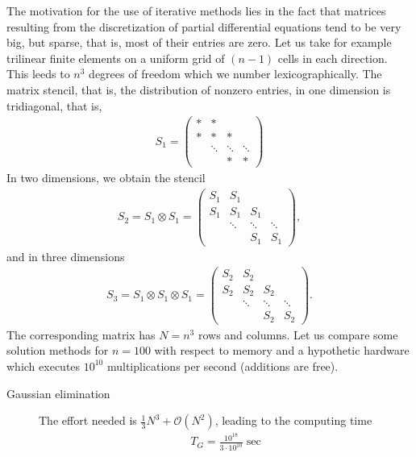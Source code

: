 
\begin{intro}
  The motivation for the use of iterative methods lies in the fact
  that matrices resulting from the discretization of partial
  differential equations tend to be very big, but sparse, that is,
  most of their entries are zero. Let us take for example trilinear
  finite elements on a uniform grid of $(n-1)$ cells in each
  direction. This leeds to $n^3$ degrees of freedom which we number
  lexicographically. The matrix stencil, that is, the distribution of
  nonzero entries, in one dimension is tridiagonal, that is,
  \begin{gather*}
    S_1 =
    \begin{pmatrix}
      * & * \\ * & * & * \\
      & \ddots & \ddots & \ddots \\
      && * & *
    \end{pmatrix}
  \end{gather*}
  In two dimensions, we obtain the stencil
  \begin{gather*}
    S_2 = S_1 \otimes S_1
    =
    \begin{pmatrix}
      S_1 & S_1 \\
      S_1 & S_1 & S_1 \\
      & \ddots & \ddots & \ddots \\
      &&S_1 & S_1
    \end{pmatrix},
  \end{gather*}
  and in three dimensions
  \begin{gather*}
    S_3 = S_1 \otimes S_1 \otimes S_1
    =
    \begin{pmatrix}
      S_2 & S_2 \\
      S_2 & S_2 & S_2 \\
      & \ddots & \ddots & \ddots \\
      &&S_2 & S_2      
    \end{pmatrix}.
  \end{gather*}
  The corresponding matrix has $N=n^3$ rows and columns. Let us compare
  some solution methods for $n=100$ with respect to memory and a
  hypothetic hardware which executes $10^{10}$ multiplications per second
  (additions are free).
  \begin{description}
  \item[Gaussian elimination] The effort needed is $\tfrac13
    N^3+\mathcal O(N^2)$,
    leading to the computing time
    \begin{gather*}
      T_{G} = \frac{10^{18}}{3\cdot 10^{10}} \;\text{sec}

\end{gather*}
\end{description}
\end{intro}
